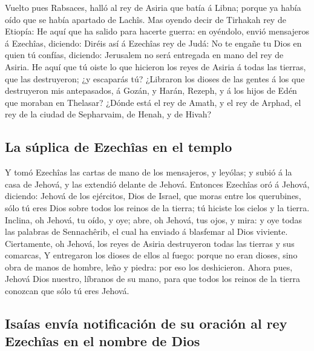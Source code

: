  Vuelto pues Rabsaces, halló al rey de Asiria que batía á
Libna; porque ya había oído que se había apartado de Lachîs.
 Mas oyendo decir de Tirhakah rey de Etiopía: He aquí que ha
salido para hacerte guerra: en oyéndolo, envió mensajeros á Ezechîas,
diciendo:  Diréis así á Ezechîas rey de Judá: No te engañe
tu Dios en quien tú confías, diciendo: Jerusalem no será entregada en
mano del rey de Asiria.  He aquí que tú oiste lo que
hicieron los reyes de Asiria á todas las tierras, que las destruyeron;
¿y escaparás tú?  ¿Libraron los dioses de las gentes á los
que destruyeron mis antepasados, á Gozán, y Harán, Rezeph, y á los hijos
de Edén que moraban en Thelasar?  ¿Dónde está el rey de
Amath, y el rey de Arphad, el rey de la ciudad de Sepharvaim, de Henah,
y de Hivah?

\hypertarget{la-suxfaplica-de-ezechuxeeas-en-el-templo}{%
\subsection{La súplica de Ezechîas en el
templo}\label{la-suxfaplica-de-ezechuxeeas-en-el-templo}}

 Y tomó Ezechîas las cartas de mano de los mensajeros, y
leyólas; y subió á la casa de Jehová, y las extendió delante de Jehová.
 Entonces Ezechîas oró á Jehová, diciendo: 
Jehová de los ejércitos, Dios de Israel, que moras entre los querubines,
sólo tú eres Dios sobre todos los reinos de la tierra; tú hiciste los
cielos y la tierra.  Inclina, oh Jehová, tu oído, y oye;
abre, oh Jehová, tus ojos, y mira: y oye todas las palabras de
Sennachêrib, el cual ha enviado á blasfemar al Dios viviente.
 Ciertamente, oh Jehová, los reyes de Asiria destruyeron
todas las tierras y sus comarcas,  Y entregaron los dioses
de ellos al fuego: porque no eran dioses, sino obra de manos de hombre,
leño y piedra: por eso los deshicieron.  Ahora pues, Jehová
Dios nuestro, líbranos de su mano, para que todos los reinos de la
tierra conozcan que sólo tú eres Jehová.

\hypertarget{isauxedas-envuxeda-notificaciuxf3n-de-su-oraciuxf3n-al-rey-ezechuxeeas-en-el-nombre-de-dios}{%
\subsection{Isaías envía notificación de su oración al rey Ezechîas en
el nombre de
Dios}\label{isauxedas-envuxeda-notificaciuxf3n-de-su-oraciuxf3n-al-rey-ezechuxeeas-en-el-nombre-de-dios}}

